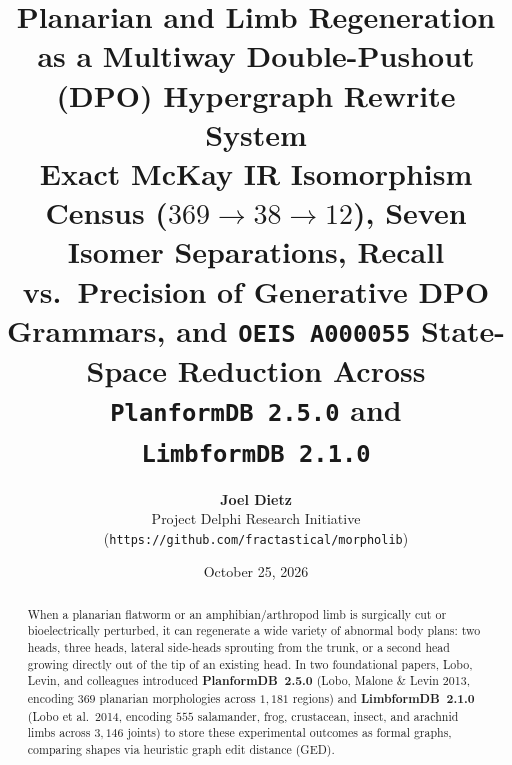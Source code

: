 \documentclass[11pt,a4paper]{article}
\title{\textbf{Planarian and Limb Regeneration as a Multiway Double-Pushout (DPO) Hypergraph Rewrite System}\\[0.55em]
\large Exact McKay IR Isomorphism Census ($369 \to 38 \to 12$), Seven Isomer Separations, Recall vs.\ Precision of Generative DPO Grammars, and \texttt{OEIS A000055} State-Space Reduction Across \texttt{PlanformDB~2.5.0} and \texttt{LimbformDB~2.1.0}}
\author{
  \textbf{Joel Dietz}\\
  \small Project Delphi Research Initiative (\texttt{https://github.com/fractastical/morpholib})
}
\date{October 25, 2026}
\theoremstyle{definition}
\theoremstyle{remark}
\begin{document}
\maketitle

\begin{abstract}
When a planarian flatworm or an amphibian/arthropod limb is surgically cut or bioelectrically perturbed, it can regenerate a wide variety of abnormal body plans: two heads, three heads, lateral side-heads sprouting from the trunk, or a second head growing directly out of the tip of an existing head. In two foundational papers, Lobo, Levin, and colleagues introduced \textbf{PlanformDB~2.5.0} (Lobo, Malone \& Levin 2013, encoding $369$ planarian morphologies across $1{,}181$ regions) and \textbf{LimbformDB~2.1.0} (Lobo et al.\ 2014, encoding $555$ salamander, frog, crustacean, insect, and arachnid limbs across $3{,}146$ joints) to store these experimental outcomes as formal graphs, comparing shapes via heuristic graph edit distance (GED).


\end{abstract}
\end{document}
